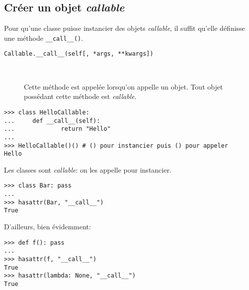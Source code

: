 \subsection{Créer un objet {\normalfont\bfseries\itshape callable}}

Pour qu'une classe puisse instancier des objets \emph{callable}, il suffit qu'elle définisse une méthode
\texttt{__call__()}.

\begin{description}
    \item[\texttt{Callable.__call__(self[, *args, **kwargs])}]~
 
    Cette méthode est appelée lorsqu'on appelle un objet. Tout objet possédant cette méthode est \emph{callable}.
\end{description}

\begin{verbatim}
>>> class HelloCallable:
...     def __call__(self):
...             return "Hello"
...
>>> HelloCallable()() # () pour instancier puis () pour appeler
Hello
\end{verbatim}


Les classes sont \emph{callable}: on les appelle pour instancier.
\begin{verbatim}
>>> class Bar: pass
...
>>> hasattr(Bar, "__call__")
True
\end{verbatim}

D'ailleurs, bien évidemment:

\begin{verbatim}
>>> def f(): pass
...
>>> hasattr(f, "__call__")
True
>>> hasattr(lambda: None, "__call__")
True
\end{verbatim}
